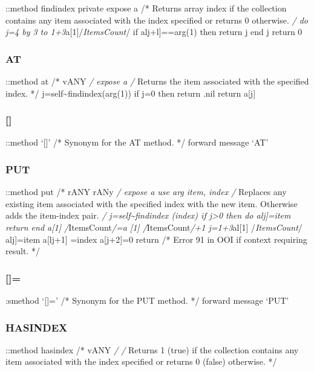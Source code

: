 ::method findindex private expose a /* Returns array index if the
collection contains any item associated with the index specified or
returns 0 otherwise. \emph{/ do j=4 by 3 to
1+3}a{[}1{]}/\emph{ItemsCount}/ if alj+l{]}==arg(1) then return j end j
return 0

\hypertarget{at}{%
\subsubsection{AT}\label{at}}

::method at /* vANY \emph{/ expose a /} Returns the item associated with
the specified index. */ j=self\textasciitilde findindex(arg(1)) if j=0
then return .nil return a{[}j{]}

\hypertarget{section}{%
\subsubsection{{[}{]}}\label{section}}

::method `{[}{]}' /* Synonym for the AT method. */ forward message `AT'

\hypertarget{put}{%
\subsubsection{PUT}\label{put}}

::method put /* rANY rANy \emph{/ expose a use arg item, index /}
Replaces any existing item associated with the specified index with the
new item. Otherwise adds the item-index pair. \emph{/
j=self\textasciitilde findindex (index) if j\textgreater0 then do
alj{]}=item return end a{[}1{]} /}ItemsCount\emph{/=a {[}1{]}
/}ItemsCount\emph{/+1 j=1+3}al{[}1{]} /\emph{ItemsCount}/ alj{]}=item
a{[}lj+1{]} =index a{[}j+2{]}=0 return /* Error 91 in OOI if context
requiring result. */

\hypertarget{section-1}{%
\subsubsection{{[}{]}=}\label{section-1}}

:smethod `{[}{]}=' /* Synonym for the PUT method. */ forward message
`PUT'

\hypertarget{hasindex}{%
\subsubsection{HASINDEX}\label{hasindex}}

::method hasindex /* vANY \emph{/ /} Returns 1 (true) if the collection
contains any item associated with the index specified or returns 0
(false) otherwise. */

